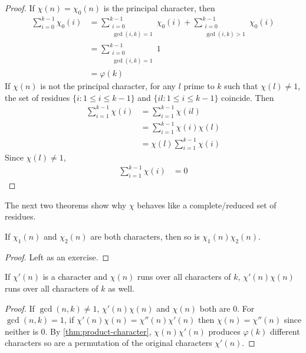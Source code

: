 \documentclass[elemannt.tex]{subfile}
\begin{document}
		\begin{proof}
			If $\chi(n)=\chi_{0}(n)$ is the principal character, then
				\begin{align*}
					\sum_{i=0}^{k-1}\chi_{0}(i)
						& = \sum_{\substack{i=0\\\gcd(i,k)=1}}^{k-1}\chi_{0}(i)+\sum_{\substack{i=0\\\gcd(i,k)>1}}^{k-1}\chi_{0}(i)\\
						& = \sum_{\substack{i=0\\\gcd(i,k)=1}}^{k-1}1\\
						& = \varphi(k)
				\end{align*}
			If $\chi(n)$ is not the principal character, for any $l$ prime to $k$ such that $\chi(l)\neq1$, the set of residues $\{i: 1\leq i\leq k-1\}$ and $\{il:1\leq i\leq k-1\}$ coincide. Then
				\begin{align*}
					\sum_{i=1}^{k-1}\chi(i)
						& = \sum_{i=1}^{k-1}\chi(il)\\
						& = \sum_{i=1}^{k-1}\chi(i)\chi(l)\\
						& = \chi(l)\sum_{i=1}^{k-1}\chi(i)
				\end{align*}
			Since $\chi(l)\neq1$,
				\begin{align*}
					\sum_{i=1}^{k-1}\chi(i)
						& = 0
				\end{align*}
		\end{proof}
	The next two theorems show why $\chi$ behaves like a complete/reduced set of residues.
		\begin{theorem}\label{thm:product-character}
			If $\chi_{1}(n)$ and $\chi_{2}(n)$ are both characters, then so is $\chi_{1}(n)\chi_{2}(n)$.
		\end{theorem}

		\begin{proof}
			Left as an exercise.
		\end{proof}

		\begin{theorem}\label{thm:char-perm}
			If $\chi'(n)$ is a character and $\chi(n)$ runs over all characters of $k$, $\chi'(n)\chi(n)$ runs over all characters of $k$ as well.
		\end{theorem}

		\begin{proof}
			If $\gcd(n,k)\neq1$, $\chi'(n)\chi(n)$ and $\chi(n)$ both are $0$. For $\gcd(n,k)=1$, if $\chi'(n)\chi(n)=\chi''(n)\chi'(n)$ then $\chi(n)=\chi''(n)$ since neither is $0$. By \autoref{thm:product-character}, $\chi(n)\chi'(n)$ produces $\varphi(k)$ different characters so are a permutation of the original characters $\chi'(n)$.
		\end{proof}
\end{document}
